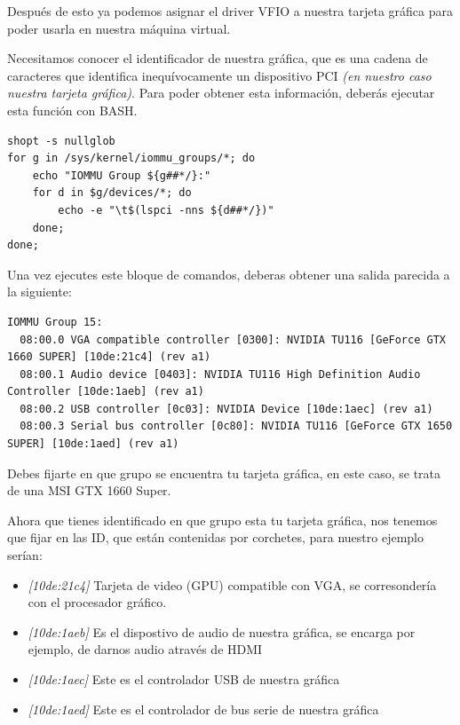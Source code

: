 \documentclass[12pt]{article}
\begin{document}
Después de esto ya podemos asignar el driver VFIO a nuestra tarjeta gráfica para poder usarla en nuestra máquina virtual.

Necesitamos conocer el identificador de nuestra gráfica, que es una cadena de caracteres que identifica inequívocamente un dispositivo PCI \emph{(en nuestro caso nuestra tarjeta gráfica)}. Para poder obtener esta información, deberás ejecutar esta función con BASH.

\begin{verbatim}
shopt -s nullglob
for g in /sys/kernel/iommu_groups/*; do
    echo "IOMMU Group ${g##*/}:"
    for d in $g/devices/*; do
        echo -e "\t$(lspci -nns ${d##*/})"
    done;
done;
\end{verbatim}

Una vez ejecutes este bloque de comandos, deberas obtener una salida parecida a la siguiente:

\begin{lstlisting}[basicstyle=\scriptsize\ttfamily]
IOMMU Group 15:
  08:00.0 VGA compatible controller [0300]: NVIDIA TU116 [GeForce GTX 1660 SUPER] [10de:21c4] (rev a1)
  08:00.1 Audio device [0403]: NVIDIA TU116 High Definition Audio Controller [10de:1aeb] (rev a1)
  08:00.2 USB controller [0c03]: NVIDIA Device [10de:1aec] (rev a1)
  08:00.3 Serial bus controller [0c80]: NVIDIA TU116 [GeForce GTX 1650 SUPER] [10de:1aed] (rev a1)
\end{lstlisting}

Debes fijarte en que grupo se encuentra tu tarjeta gráfica, en este caso, se trata de una MSI GTX 1660 Super.

Ahora que tienes identificado en que grupo esta tu tarjeta gráfica, nos tenemos que fijar en las ID, que están contenidas por corchetes, para nuestro ejemplo serían:

\begin{itemize}
	\setlength\itemsep{-0.2em}
	\item \emph{[10de:21c4]} Tarjeta de video (GPU) compatible con VGA, se corresondería con el procesador gráfico.
	\item \emph{[10de:1aeb]} Es el dispostivo de audio de nuestra gráfica, se encarga por ejemplo, de darnos audio através de HDMI
	\item \emph{[10de:1aec]} Este es el controlador USB de nuestra gráfica
	\item \emph{[10de:1aed]} Este es el controlador de bus serie de nuestra gráfica
\end{itemize}
\end{document}
